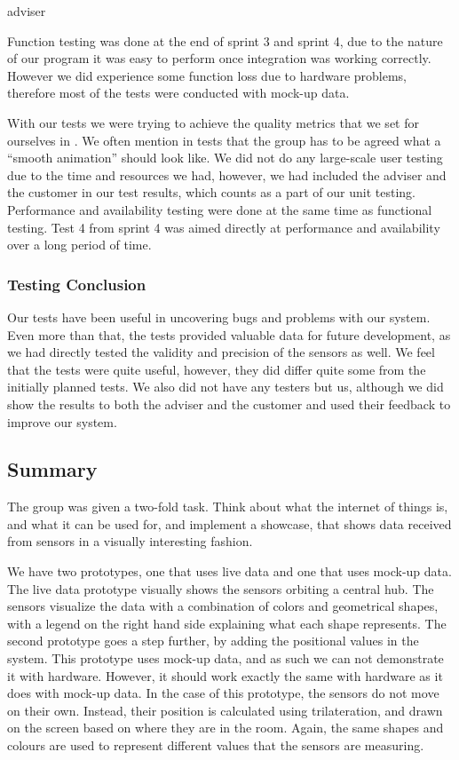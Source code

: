 adviser\documentclass[../document]{subfiles}
\begin{document}
Function testing was done at the end of sprint 3 and sprint 4, due to the nature of our program it was easy to perform once integration was working correctly. However we did experience some function loss due to hardware problems, therefore most of the tests were conducted with mock-up data.

With our tests we were trying to achieve the quality metrics that we set for ourselves in . We often mention in tests that the group has to be agreed what a “smooth animation” should look like. We did not do any large-scale user testing due to the time and resources we had, however, we had included the adviser and the customer in our test results, which counts as a part of our unit testing. Performance and availability testing were done at the same time as functional testing. Test 4 from sprint 4 was aimed directly at performance and availability over a long period of time. 

\subsubsection{Testing Conclusion}
Our tests have been useful in uncovering bugs and problems with our system. Even more than that, the tests provided valuable data for future development, as we had directly tested the validity and precision of the sensors as well. We feel that the tests were quite useful, however, they did differ quite some from the initially planned tests. We also did not have any testers but us, although we did show the results to both the adviser and the customer and used their feedback to improve our system. 

\subsection{Summary}
The group was given a two-fold task. Think about what the internet of things is, and what it can be used for, and implement a showcase, that shows data received from sensors in a visually interesting fashion.

We have two prototypes, one that uses live data and one that uses mock-up data. The live data prototype visually shows the sensors orbiting a central hub. The sensors visualize the data with a combination of colors and geometrical shapes, with a legend on the right hand side explaining what each shape represents. The second prototype goes a step further, by adding the positional values in the system. This prototype uses mock-up data, and as such we can not demonstrate it with hardware. However, it should work exactly the same with hardware as it does with mock-up data. In the case of this prototype, the sensors do not move on their own. Instead, their position is calculated using trilateration, and drawn on the screen based on where they are in the room. Again, the same shapes and colours are used to represent different values that the sensors are measuring.
\end{document}
